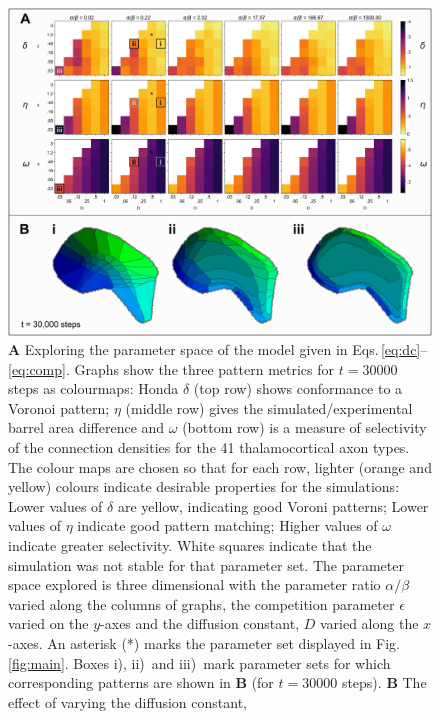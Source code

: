 \documentclass[9pt,lineno]{elife}
\newcommand{\paramsearch}[1]{\textcolor{revbblack}{#1}}
\begin{document}
\begin{figure}
  \begin{fullwidth}
    \includegraphics[width=\linewidth]{./Fig2.png}
    \caption{\paramsearch{\textbf{A} Exploring the parameter space of the
        model given in Eqs.\,\ref{eq:dc}--\ref{eq:comp}. Graphs show the three
        pattern metrics for $t=30000$ steps as colourmaps: Honda $\delta$ (top
        row) shows conformance to a Voronoi pattern; $\eta$ (middle row) gives
        the simulated/experimental barrel area difference and $\omega$ (bottom
        row) is a measure of selectivity of the connection densities for the
        41 thalamocortical axon types. The colour maps are chosen so that for
        each row, lighter (orange and yellow) colours indicate desirable
        properties for the simulations: Lower values of $\delta$ are yellow,
        indicating good Voroni patterns; Lower values of $\eta$ indicate good
        pattern matching; Higher values of $\omega$ indicate greater
        selectivity. White squares indicate that the simulation was not stable
        for that parameter set.
%
        The parameter space explored is three dimensional with the parameter
        ratio $\alpha/\beta$ varied along the columns of graphs, the
        competition parameter $\epsilon$ varied on the $y$-axes and the
        diffusion constant, $D$ varied along the $x$-axes. An asterisk (*)
        marks the parameter set displayed in Fig.\,\ref{fig:main}. Boxes i),
        ii)~and iii)~mark parameter sets for which corresponding patterns are
        shown in \textbf{B} (for $t=30000$ steps).
%
        \textbf{B} The effect of varying the diffusion constant,
}}
\end{fullwidth}
\end{figure}
\end{document}
